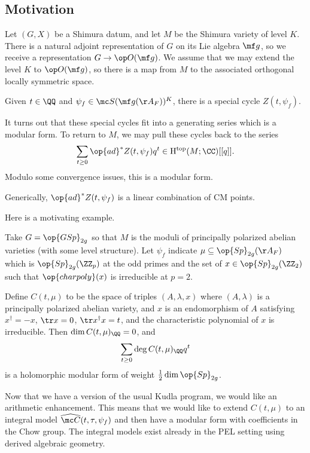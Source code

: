 \documentclass{article}
\begin{document}
\subsection{Motivation}
Let $(G,X)$ be a Shimura datum, and let $M$ be the Shimura variety of level $K$. There is a natural adjoint representation of $G$ on its Lie algebra $\mf g$, so we receive a representation $G\to\op O(\mf g)$. We assume that we may extend the level $K$ to $\op O(\mf g)$, so there is a map from $M$ to the associated orthogonal locally symmetric space.
\begin{notation}
	Given $t\in\QQ$ and $\psi_f\in\mc S(\mf g(\AA_F))^K$, there is a special cycle $Z(t,\psi_f)$.
\end{notation}
It turns out that these special cycles fit into a generating series which is a modular form. To return to $M$, we may pull these cycles back to the series
\[\sum_{t\ge0}\op{ad}^*Z(t,\psi_f)q^t\in\mathrm H^{\mathrm{top}}(M;\CC)[[q]].\]
Modulo some convergence issues, this is a modular form.
\begin{remark}
	Generically, $\op{ad}^*Z(t,\psi_f)$ is a linear combination of CM points.
\end{remark}
Here is a motivating example.
\begin{example}[Siegel]
	Take $G=\op{GSp}_{2g}$ so that $M$ is the moduli of principally polarized abelian varieties (with some level structure). Let $\psi_f$ indicate $\mu\subseteq\op{Sp}_{2g}(\AA_F)$ which is $\op{Sp}_{2g}(\ZZ_p)$ at the odd primes and the set of $x\in\op{Sp}_{2g}(\ZZ_2)$ such that $\op{charpoly}(x)$ is irreducible at $p=2$.
\end{example}
\begin{theorem}
	Define $C(t,\mu)$ to be the space of triples $(A,\lambda,x)$ where $(A,\lambda)$ is a principally polarized abelian variety, and $x$ is an endomorphism of $A$ satisfying $x^\dagger=-x$, $\tr x=0$, $\tr x^\dagger x=t$, and the characteristic polynomial of $x$ is irreducible. Then $\dim C(t,\mu)_\QQ=0$, and
	\[\sum_{t\ge0}\deg C(t,\mu)_\QQ q^t\]
	is a holomorphic modular form of weight $\frac12\dim\op{Sp}_{2g}$.
\end{theorem}
Now that we have a version of the usual Kudla program, we would like an arithmetic enhancement. This means that we would like to extend $C(t,\mu)$ to an integral model $\widehat{\mc C}(t,\tau,\psi_f)$ and then have a modular form with coefficients in the Chow group. The integral models exist already in the PEL setting using derived algebraic geometry.
\end{document}
